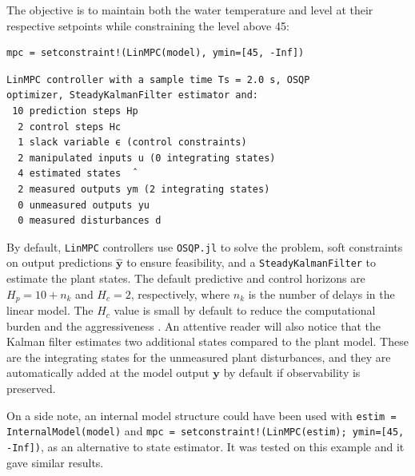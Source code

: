 The objective is to maintain both the water temperature and level at their respective setpoints while constraining the level above 45:
\begin{verbatim}
mpc = setconstraint!(LinMPC(model), ymin=[45, -Inf])
\end{verbatim}
\spacerepl
\begin{verbatim}
LinMPC controller with a sample time Ts = 2.0 s, OSQP
optimizer, SteadyKalmanFilter estimator and:
 10 prediction steps Hp
  2 control steps Hc
  1 slack variable ϵ (control constraints)
  2 manipulated inputs u (0 integrating states)
  4 estimated states  ̂
  2 measured outputs ym (2 integrating states)
  0 unmeasured outputs yu
  0 measured disturbances d
\end{verbatim}
By default, \texttt{LinMPC} controllers use \texttt{OSQP.jl} \citep{osqp} to solve the problem, soft constraints on output predictions $\mathbf{\hat y}$ to ensure feasibility, and a \texttt{SteadyKalmanFilter} to estimate the plant states. The default predictive and control horizons are $H_p = 10 + n_k$ and $H_c = 2$, respectively, where $n_k$ is the number of delays in the linear model. The $H_c$ value is small by default to reduce the computational burden and the aggressiveness \citep{mpcHcAnalysis}. An attentive reader will also notice that the Kalman filter estimates two additional states compared to the plant model. These are the integrating states for the unmeasured plant disturbances, and they are automatically added at the model output $\mathbf{y}$ by default if observability is preserved.

On a side note, an internal model structure could have been used with \texttt{estim = InternalModel(model)} and \texttt{mpc = setconstraint!(LinMPC(estim); ymin=[45, -Inf])}, as an alternative to state estimator. It was tested on this example and it gave similar results.

